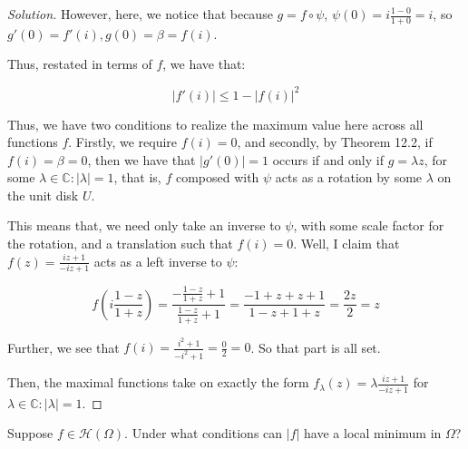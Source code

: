 \documentclass[10pt]{article}
\newenvironment{problem}[2][]{\begin{trivlist}
\item[\hskip \labelsep {\bfseries #1}\hskip \labelsep {\bfseries #2.}]}{\end{trivlist}}
\begin{document}
\begin{proof}[Solution]
However, here, we notice that because $g = f \circ \psi$, $\psi(0) = i \frac{ 1 - 0}{ 1+ 0} = i$, so $g'(0) = f'(i), g(0) = \beta = f(i)$. 

Thus, restated in terms of $f$, we have that:

$$ |f'(i)| \leq 1 - | f(i)|^2 $$

Thus, we have two conditions to realize the maximum value here across all functions $f$. Firstly, we require $f(i) = 0$, and secondly, by Theorem 12.2, if $f(i)= \beta = 0$, then we have that $|g'(0)|  = 1$ occurs if and only if $g = \lambda z$, for some $\lambda \in \mathbb{C} : | \lambda | = 1$, that is, $f$ composed with $\psi$ acts as a rotation by some $\lambda$ on the unit disk $U$. 

This means that, we need only take an inverse to $\psi$, with some scale factor for the rotation, and a translation such that $f(i) = 0$. Well, I claim that $f(z) = \frac{iz + 1}{-iz + 1}$ acts as a left inverse to $\psi$:

$$ f\left(i \frac{1-z}{1+z}\right) = \frac{- \frac{1-z}{1+z} + 1}{ \frac{1-z}{1+z} +1} = \frac{ -1 + z + z + 1}{ 1-z + 1 + z} = \frac{2z}{2} = z$$

Further, we see that $f(i) = \frac{i^2 + 1}{-i^2 + 1} = \frac{0}{2} = 0$. So that part is all set.

Then, the maximal functions take on exactly the form $f_\lambda(z) = \lambda  \frac{iz + 1}{-iz + 1}$ for $\lambda \in \mathbb{C} : |\lambda| = 1$. 

\end{proof}

\begin{problem}{Question 4}

Suppose $f \in \mathcal{H}(\Omega)$. Under what conditions can $|f|$ have a local minimum in $\Omega$?

\end{problem}
 
\end{document}
